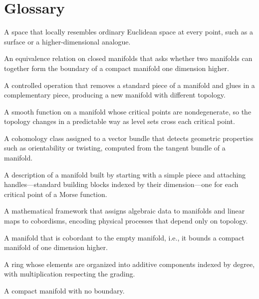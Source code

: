 \section*{Glossary}
\begin{description}[leftmargin=*,style=nextline,itemsep=0.3em]
\item[\textbf{Manifold.}] A space that locally resembles ordinary Euclidean space at every point, such as a surface or a higher-dimensional analogue.
\item[\textbf{Cobordism.}] An equivalence relation on closed manifolds that asks whether two manifolds can together form the boundary of a compact manifold one dimension higher.
\item[\textbf{Surgery.}] A controlled operation that removes a standard piece of a manifold and glues in a complementary piece, producing a new manifold with different topology.
\item[\textbf{Morse function.}] A smooth function on a manifold whose critical points are nondegenerate, so the topology changes in a predictable way as level sets cross each critical point.
\item[\textbf{Characteristic class.}] A cohomology class assigned to a vector bundle that detects geometric properties such as orientability or twisting, computed from the tangent bundle of a manifold.
\item[\textbf{Handle decomposition.}] A description of a manifold built by starting with a simple piece and attaching handles---standard building blocks indexed by their dimension---one for each critical point of a Morse function.
\item[\textbf{Topological quantum field theory.}] A mathematical framework that assigns algebraic data to manifolds and linear maps to cobordisms, encoding physical processes that depend only on topology.
\item[\textbf{Null-cobordant.}] A manifold that is cobordant to the empty manifold, i.e., it bounds a compact manifold of one dimension higher.
\item[\textbf{Graded ring.}] A ring whose elements are organized into additive components indexed by degree, with multiplication respecting the grading.
\item[\textbf{Closed manifold.}] A compact manifold with no boundary.
\end{description}

